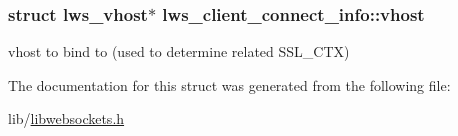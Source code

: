 \subsubsection[{\texorpdfstring{vhost}{vhost}}]{\setlength{\rightskip}{0pt plus 5cm}struct lws\+\_\+vhost$\ast$ lws\+\_\+client\+\_\+connect\+\_\+info\+::vhost}\hypertarget{structlws__client__connect__info_a3893181d728f326f9f5b47c1459cb8be}{}\label{structlws__client__connect__info_a3893181d728f326f9f5b47c1459cb8be}
vhost to bind to (used to determine related S\+S\+L\+\_\+\+C\+TX) 

The documentation for this struct was generated from the following file\+:\begin{DoxyCompactItemize}
\item 
lib/\hyperlink{libwebsockets_8h}{libwebsockets.\+h}\end{DoxyCompactItemize}
